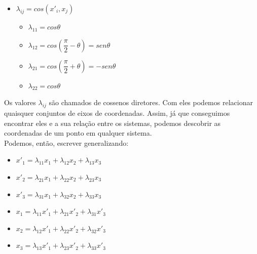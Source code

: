 \documentclass[12pt,a4paper]{article}
\begin{document}
\begin{enumerate}
\begin{itemize}
            \item $\lambda_{ij}=cos(x'_i,x_j)$
            
                \begin{itemize}
                    \item $\lambda_{11} = cos\theta$
                    \item $\lambda_{12} = cos(\dfrac{\pi}{2} - \theta) = sen\theta$
                    \item $\lambda_{21} = cos(\dfrac{\pi}{2} + \theta) = - sen\theta$
                    \item $\lambda_{22} = cos\theta$
                \end{itemize}
                
        \end{itemize}
        
        
        Os valores $\lambda_{ij}$ são chamados de cossenos diretores. Com eles podemos relacionar quaisquer conjuntos de eixos de coordenadas. Assim, já que conseguimos encontrar eles e a sua relação entre os sistemas, podemos descobrir as coordenadas de um ponto em qualquer sistema.\\
        
        Podemos, então, escrever generalizando:
            

        \begin{itemize}
            \item $x'_1 = \lambda_{11} x_1 + \lambda_{12} x_2 + \lambda_{13} x_3$
            \item $x'_2 = \lambda_{21} x_1 + \lambda_{22} x_2 + \lambda_{23} x_3$
            \item $x'_3 = \lambda_{31} x_1 + \lambda_{32} x_2 + \lambda_{33} x_3$
        \end{itemize}
        
        \begin{itemize}
            \item $x_1 = \lambda_{11} x'_1 + \lambda_{21} x'_2 + \lambda_{31} x'_3$
            \item $x_2 = \lambda_{12} x'_1 + \lambda_{22} x'_2 + \lambda_{32} x'_3$
            \item $x_3 = \lambda_{13} x'_1 + \lambda_{23} x'_2 + \lambda_{33} x'_3$
        \end{itemize}


\end{enumerate}
\end{document}

